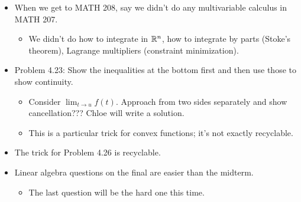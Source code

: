\documentclass[../../notes.tex]{subfiles}
\begin{document}
\begin{itemize}
    \item When we get to MATH 208, say we didn't do any multivariable calculus in MATH 207.
    \begin{itemize}
        \item We didn't do how to integrate in $\mathbb{R}^n$, how to integrate by parts (Stoke's theorem), Lagrange multipliers (constraint minimization).
    \end{itemize}
    \item Problem 4.23: Show the inequalities at the bottom first and then use those to show continuity.
    \begin{itemize}
        \item Consider $\lim_{t\to u}f(t)$. Approach from two sides separately and show cancellation??? Chloe will write a solution.
        \item This is a particular trick for convex functions; it's not exactly recyclable.
    \end{itemize}
    \item The trick for Problem 4.26 is recyclable.
    \item Linear algebra questions on the final are easier than the midterm.
    \begin{itemize}
        \item The last question will be the hard one this time.
    \end{itemize}
\end{itemize}
\end{document}
